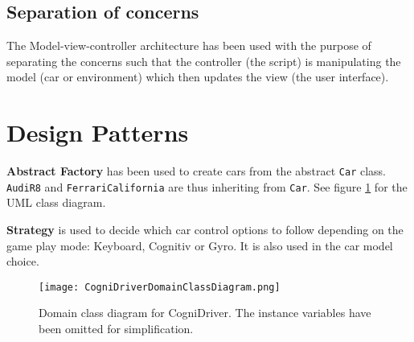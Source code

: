 \subsection{Separation of concerns}
The Model-view-controller architecture has been used with the purpose of separating the concerns such that the controller (the script) is manipulating the model (car or environment) which then updates the view (the user interface).

\section{Design Patterns}

\textbf{Abstract Factory} has been used to create cars from the abstract \texttt{Car} class. \texttt{AudiR8} and \texttt{FerrariCalifornia} are thus inheriting from \texttt{Car}. See figure \ref{fig:classDiagram} for the UML class diagram.

\textbf{Strategy} is used to decide which car control options to follow depending on the game play mode: Keyboard, Cognitiv or Gyro. It is also used in the car model choice.

\begin{landscape}
\pagestyle{plain}
\begin{figure}
  \centering
  \texttt{[image: CogniDriverDomainClassDiagram.png]}
  \caption{Domain class diagram for CogniDriver. The instance variables have been omitted for simplification.}
    \label{fig:classDiagram}           
\end{figure}
\end{landscape}